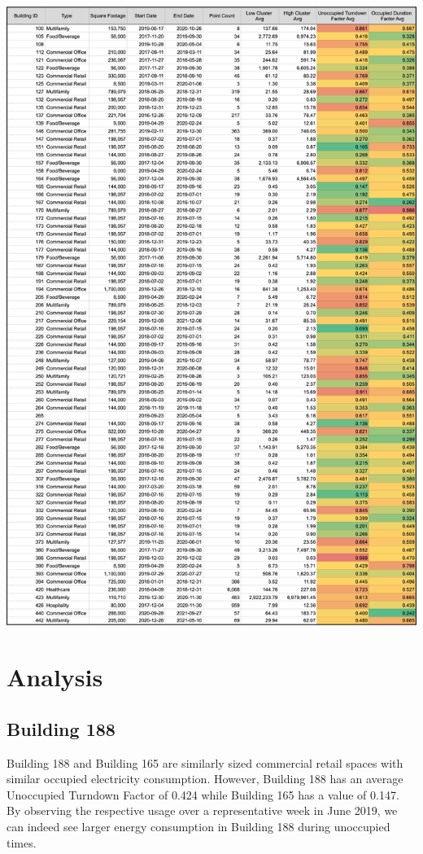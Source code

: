 \documentclass[a4paper]{article}
\begin{document}
\includegraphics[width=\columnwidth]{./images/KPI_Result_Table.png}

\section{Analysis}

\subsection{Building 188}

Building 188 and Building 165 are similarly sized commercial retail spaces with similar occupied electricity consumption. However, Building 188 has an average Unoccupied Turndown Factor of 0.424 while Building 165 has a value of 0.147. By observing the respective usage over a representative week in June 2019, we can indeed see larger energy consumption in Building 188 during unoccupied times.
\end{document}
